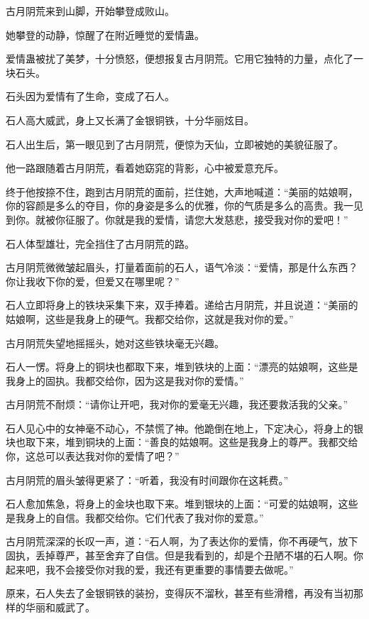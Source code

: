 \begin{this_body}
古月阴荒来到山脚，开始攀登成败山。

她攀登的动静，惊醒了在附近睡觉的爱情蛊。

爱情蛊被扰了美梦，十分愤怒，便想报复古月阴荒。它用它独特的力量，点化了一块石头。

石头因为爱情有了生命，变成了石人。

石人高大威武，身上又长满了金银铜铁，十分华丽炫目。

石人出生后，第一眼见到了古月阴荒，便惊为天仙，立即被她的美貌征服了。

他一路跟随着古月阴荒，看着她窈窕的背影，心中被爱意充斥。

终于他按捺不住，跑到古月阴荒的面前，拦住她，大声地喊道：“美丽的姑娘啊，你的容颜是多么的夺目，你的身姿是多么的优雅，你的气质是多么的高贵。我一见到你。就被你征服了。你就是我的爱情，请您大发慈悲，接受我对你的爱吧！”

石人体型雄壮，完全挡住了古月阴荒的路。

古月阴荒微微皱起眉头，打量着面前的石人，语气冷淡：“爱情，那是什么东西？你让我收下你的爱，但爱又在哪里呢？”

石人立即将身上的铁块采集下来，双手捧着。递给古月阴荒，并且说道：“美丽的姑娘啊，这些是我身上的硬气。我都交给你，这就是我对你的爱。”

古月阴荒失望地摇摇头，她对这些铁块毫无兴趣。

石人一愣。将身上的铜块也都取下来，堆到铁块的上面：“漂亮的姑娘啊，这些是我身上的固执。我都交给你，因为这是我对你的爱情。”

古月阴荒不耐烦：“请你让开吧，我对你的爱毫无兴趣，我还要救活我的父亲。”

石人见心中的女神毫不动心，不禁慌了神。他跪倒在地上，下定决心，将身上的银块也取下来，堆到铜块的上面：“善良的姑娘啊。这些是我身上的尊严。我都交给你，这总可以表达我对你的爱情了吧？”

古月阴荒的眉头皱得更紧了：“听着，我没有时间跟你在这耗费。”

石人愈加焦急，将身上的金块也取下来。堆到银块的上面：“可爱的姑娘啊，这些是我身上的自信。我都交给你。它们代表了我对你的爱意。”

古月阴荒深深的长叹一声，道：“石人啊，为了表达你的爱情，你不再硬气，放下固执，丢掉尊严，甚至舍弃了自信。但是我看到的，却是个丑陋不堪的石人啊。你起来吧，我不会接受你对我的爱，我还有更重要的事情要去做呢。”

原来，石人失去了金银铜铁的装扮，变得灰不溜秋，甚至有些滑稽，再没有当初那样的华丽和威武了。


\end{this_body}
